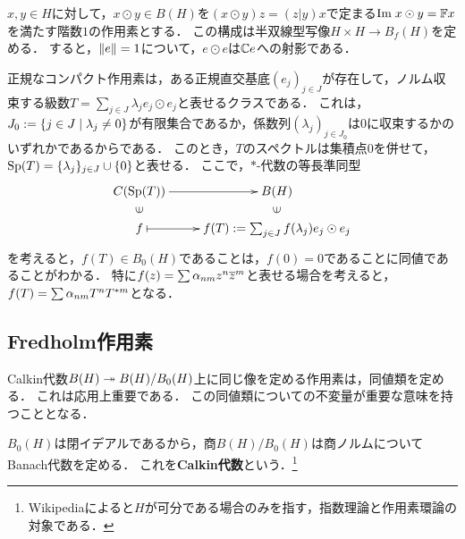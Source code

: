 \documentclass[uplatex,dvipdfmx]{jsreport}
\begin{document}
\begin{notation}
    $x,y\in H$に対して，$x\odot y\in B(H)$を$(x\odot y)z=(z|y)x$で定まる$\mathrm{Im}\; x\odot y=\mathbb{F} x$を満たす階数$1$の作用素とする．
    この構成は半双線型写像$H\times H\to B_f(H)$を定める．
    すると，$\|e\|=1$について，$e\odot e$は$\mathbb{C} e$への射影である．
\end{notation}

\begin{remarks}[正規なコンパクト作用素についてのスペクトル写像定理の消息]
    正規なコンパクト作用素は，ある正規直交基底$(e_j)_{j\in J}$が存在して，ノルム収束する級数$T=\sum_{j\in J}\lambda_je_j\odot e_j$と表せるクラスである．
    これは，$J_0:=\left\{j\in J\mid\lambda_j\ne0\right\}$が有限集合であるか，係数列$(\lambda_j)_{j\in J_0}$は$0$に収束するかのいずれかであるからである．
    このとき，$T$のスペクトルは集積点$0$を併せて，$\mathrm{Sp}(T)=\{\lambda_j\}_{j\in J}\cup\{0\}$と表せる．
    ここで，$*$-代数の等長準同型
    \[\xymatrix@R-2pc{
        C(\Sp(T))\ar[r]&B(H)\\
        \rotatebox[origin=c]{90}{$\in$}&\rotatebox[origin=c]{90}{$\in$}\\
        f\ar@{|->}[r]&f(T):=\sum_{j\in J}f(\lambda_j)e_j\odot e_j
    }\]
    を考えると，$f(T)\in B_0(H)$であることは，$f(0)=0$であることに同値であることがわかる．
    特に$f(z)=\sum\alpha_{nm}z^n\overline{z}^m$と表せる場合を考えると，$f(T)=\sum\alpha_{nm}T^nT^{*m}$となる．
\end{remarks}

\subsection{Fredholm作用素}

\begin{tcolorbox}[colframe=ForestGreen, colback=ForestGreen!10!white,breakable,colbacktitle=ForestGreen!40!white,coltitle=black,fonttitle=\bfseries\sffamily,
title=]
    Calkin代数$B(H)\twoheadrightarrow B(H)/B_0(H)$上に同じ像を定める作用素は，同値類を定める．
    これは応用上重要である．
    この同値類についての不変量が重要な意味を持つこととなる．
\end{tcolorbox}

\begin{definition}
    $B_0(H)$は閉イデアルであるから，商$B(H)/B_0(H)$は商ノルムについてBanach代数を定める．
    これを\textbf{Calkin代数}という．\footnote{Wikipediaによると$H$が可分である場合のみを指す，指数理論と作用素環論の対象である．}
\end{definition}
\end{document}
